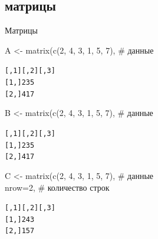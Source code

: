 \subsection{матрицы}
\begin{frame}[fragile]{Матрицы}
\begin{itemize}
\mytem A <- matrix(c(2, 4, 3, 1, 5, 7), \hfill \# данные \\
{\color{red!13!blue}{  ncol=3) \hfill \# количество колонок}}
\footnotesize 
\begin{alltt}
     [,1] [,2] [,3]
[1,]    2    3    5
[2,]    4    1    7
\end{alltt}
\normalsize
\vfill
\mytem B <- matrix(c(2, 4, 3, 1, 5, 7), \hfill \# данные \\
{\color{red!13!blue}{  nrow=2)              \hfill \# количество строк}}
\footnotesize 
\begin{alltt}
     [,1] [,2] [,3]
[1,]    2    3    5
[2,]    4    1    7
\end{alltt}
\normalsize
\vfill
\mytem C <- matrix(c(2, 4, 3, 1, 5, 7), \hfill \# данные \\
  nrow=2,              \hfill \# количество строк\\
  {\color{red!13!blue}{  byrow = TRUE) \hfill \# по строчкам}}
\footnotesize 
\begin{alltt}
     [,1] [,2] [,3]
[1,]    2    4    3
[2,]    1    5    7
\end{alltt}
\normalsize
\end{itemize}
\end{frame}

